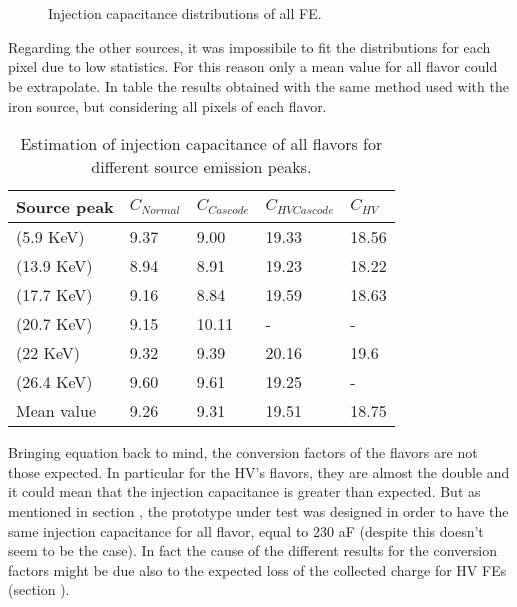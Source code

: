 \begin{figure}
\centering
{}\quad
{}\\
\quad
{}\\
\caption{Injection capacitance distributions of all FE.}
\label{fig:cap_dist}
\end{figure} 

Regarding the other sources, it was impossibile to fit the distributions for each pixel due to low statistics. For this reason only a mean value for all flavor could be extrapolate. In table  the results obtained with the same method used with the iron source, but considering all pixels of each flavor.

\begin{table}[h!]
\centering
\begin{tabular}{>{} C{2.8cm}|C{1.7cm}|C{1.8cm}|C{1.7cm}|C{1.7cm}}
Source peak & $C_{Normal}$ & $C_{Cascode}$ & $C_{HV Cascode}$ & $C_{HV}$\\[2ex]
\hline
{} (5.9 KeV) & 9.37 & 9.00 & 19.33 & 18.56 \\[0.5ex]
\hline
{} (13.9 KeV) & 8.94 & 8.91 & 19.23 & 18.22 \\[0.5ex]
\hline
{} (17.7 KeV) & 9.16 & 8.84 & 19.59 & 18.63 \\[0.5ex]
\hline
{} (20.7 KeV) & 9.15 & 10.11 & - & -\\[0.5ex]
\hline
{} (22 KeV) & 9.32 & 9.39 & 20.16 & 19.6 \\[0.5ex]
\hline
{} (26.4 KeV) & 9.60 & 9.61 & 19.25 & - \\[1.5ex]
\hline
{}Mean value & 9.26 & 9.31 & 19.51 & 18.75 \\[1.5ex]
\end{tabular}
\caption{Estimation of injection capacitance of all flavors for different source emission peaks.}
\label{tab:cap_mean}
\end{table}


Bringing equation  back to mind, the conversion factors of the flavors are not those expected. In particular for the HV's flavors, they are almost the double and it could mean that the injection capacitance is greater than expected. But as mentioned in section , the prototype under test was designed in order to have the same injection capacitance for all flavor, equal to 230 aF (despite this doesn't seem to be the case).
In fact the cause of the different results for the conversion factors might be due also to the expected loss of the collected charge for HV FEs (section ).


